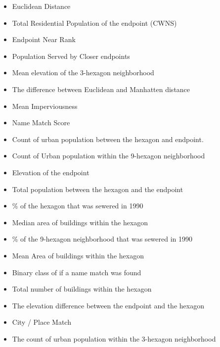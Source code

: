 \documentclass[
  letterpaper,
  DIV=11,
  numbers=noendperiod]{scrartcl}
\providecommand{\tightlist}{%
  \setlength{\itemsep}{0pt}\setlength{\parskip}{0pt}}\usepackage{longtable,booktabs,array}
\begin{document}
\begin{itemize}
\tightlist
\item
  Euclidean Distance
\item
  Total Residential Population of the endpoint (CWNS)
\item
  Endpoint Near Rank
\item
  Population Served by Closer endpoints
\item
  Mean elevation of the 3-hexagon neighborhood
\item
  The difference between Euclidean and Manhatten distance
\item
  Mean Imperviousness
\item
  Name Match Score
\item
  Count of urban population between the hexagon and endpoint.
\item
  Count of Urban population within the 9-hexagon neighborhood
\item
  Elevation of the endpoint
\item
  Total population between the hexagon and the endpoint
\item
  \% of the hexagon that was sewered in 1990
\item
  Median area of buildings within the hexagon
\item
  \% of the 9-hexagon neighborhood that was sewered in 1990
\item
  Mean Area of buildings within the hexagon
\item
  Binary class of if a name match was found
\item
  Total number of buildings within the hexagon
\item
  The elevation difference between the endpoint and the hexagon
\item
  City / Place Match
\item
  The count of urban population within the 3-hexagon neighborhood
\end{itemize}
\end{document}
